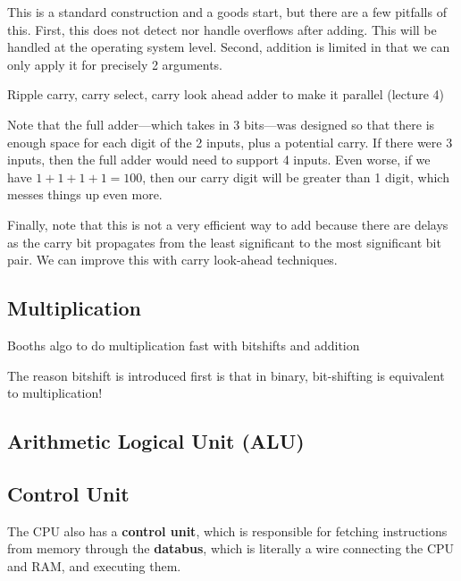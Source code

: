   \begin{corollary}
    
  \end{corollary}

  This is a standard construction and a goods start, but there are a few pitfalls of this. First, this does not detect nor handle overflows after adding. This will be handled at the operating system level. Second, addition is limited in that we can only apply it for precisely 2 arguments. 

  Ripple carry, carry select, carry look ahead adder to make it parallel (lecture 4)

  \begin{example}
    Note that the full adder---which takes in 3 bits---was designed so that there is enough space for each digit of the 2 inputs, plus a potential carry. If there were 3 inputs, then the full adder would need to support 4 inputs. Even worse, if we have $1 + 1 + 1 + 1 = 100$, then our carry digit will be greater than 1 digit, which messes things up even more. 
  \end{example}

  Finally, note that this is not a very efficient way to add because there are delays as the carry bit propagates from the least significant to the most significant bit pair. We can improve this with carry look-ahead techniques. 


\subsection{Multiplication} 

  Booths algo to do multiplication fast with bitshifts and addition 

  The reason bitshift is introduced first is that in binary, bit-shifting is equivalent to multiplication! 

  \begin{theorem}
    
  \end{theorem}

  \begin{theorem}
    
  \end{theorem}

\subsection{Arithmetic Logical Unit (ALU)}

\subsection{Control Unit} 

  The CPU also has a \textbf{control unit}, which is responsible for fetching instructions from memory through the \textbf{databus}, which is literally a wire connecting the CPU and RAM, and executing them. 

